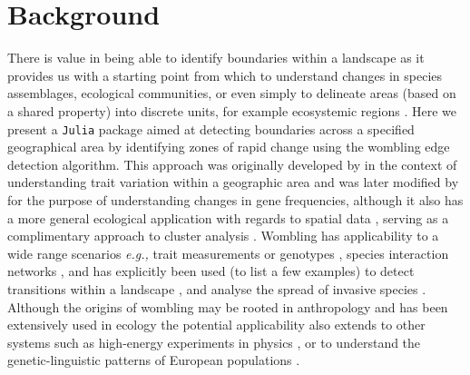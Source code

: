 \section{Background}\label{background}

There is value in being able to identify boundaries within a landscape
as it provides us with a starting point from which to understand changes
in species assemblages, ecological communities, or even simply to
delineate areas (based on a shared property) into discrete units, for
example ecosystemic regions \cite{Post2007ProBou, Fortin2000IssRel}.
Here we present a \texttt{Julia} \cite{Bezanson2017JulFre} package aimed
at detecting boundaries across a specified geographical area by
identifying zones of rapid change using the wombling edge detection
algorithm. This approach was originally developed by \cite{Womble1951DifSys}
in the context of understanding trait variation within a geographic area
and was later modified by \cite{Barbujani1989DetReg} for the purpose of
understanding changes in gene frequencies, although it also has a more
general ecological application with regards to spatial data
\cite{Fortin2005SpaAna}, serving as a complimentary approach to cluster
analysis \cite{Fortin1995DelEco}. Wombling has applicability to a wide
range scenarios \emph{e.g.,} trait measurements or genotypes
\cite{Barbujani1989DetReg}, species interaction networks
\cite{Fortin2021NetEco}, and has explicitly been used (to list a few
examples) to detect transitions within a landscape
\cite{Philibert2008SpaStr, Camarero2000BouDet}, and analyse the spread
of invasive species \cite{Fitzpatrick2010EcoBou}. Although the origins
of wombling may be rooted in anthropology and has been extensively used
in ecology the potential applicability also extends to other systems
such as high-energy experiments in physics \cite{Matchev2020FinWom}, or
to understand the genetic-linguistic patterns of European populations
\cite{Sokal1990GenLan}.

